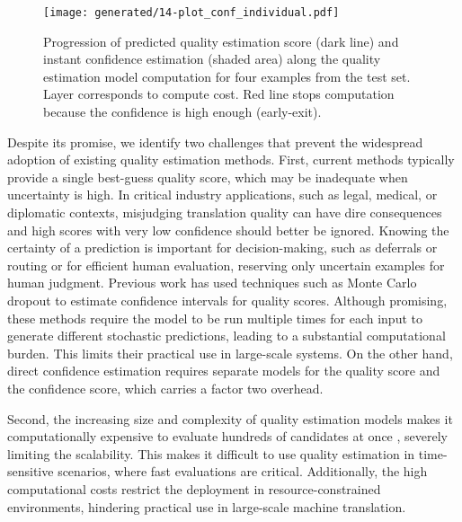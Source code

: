 \begin{figure}[t]
    \centering
    \texttt{[image: generated/14-plot\_conf\_individual.pdf]}

    \vspace{-3mm}
    \caption{Progression of predicted quality estimation score (dark line) and instant confidence estimation (shaded area) along the quality estimation model computation for four examples from the test set. Layer corresponds to compute cost.
    Red \textcolor{red!80!black}{l}ine stops computation because the confidence is high enough (early-exit).
    }
    \vspace{-2mm}
    \label{fig:14-plot_conf_individual}
\end{figure}


Despite its promise, we identify two challenges that prevent the widespread adoption of existing quality estimation methods.
First, current methods typically provide a single best-guess quality score, which may be inadequate when uncertainty is high.
In critical industry applications, such as legal, medical, or diplomatic contexts, misjudging translation quality can have dire consequences and high scores with very low confidence should better be ignored.
Knowing the certainty of a prediction is important for decision-making, such as deferrals or routing \citep{zhang2025leveraginguncertaintyestimationefficient,farinhas2025translatesmarthardcascaded} or
for efficient human evaluation, reserving only uncertain examples for human judgment.
Previous work has used techniques such as Monte Carlo dropout \citep{glushkova-etal-2021-uncertainty-aware} to estimate confidence intervals for quality scores.
Although promising, these methods require the model to be run multiple times for each input to generate different stochastic predictions, leading to a substantial computational burden. This limits their practical use in large-scale systems.
On the other hand, direct confidence estimation \citep{zerva-etal-2022-disentangling} requires separate models for the quality score and the confidence score, which carries a factor two overhead.

Second, the increasing size and complexity of quality estimation models makes it computationally expensive to evaluate hundreds of candidates at once \citep{guerreiro-etal-2024-xcomet}, severely limiting the scalability.
This makes it difficult to use quality estimation in time-sensitive scenarios, where fast evaluations are critical.
Additionally, the high computational costs restrict the deployment in resource-constrained environments, hindering practical use in large-scale machine translation.




